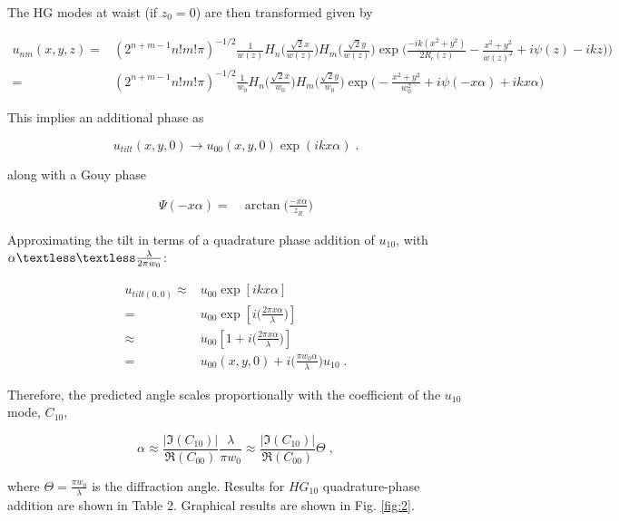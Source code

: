 \documentclass[aps,twoside,secnumarabic,balancelastpage,amsmath,amssymb,nofootinbib,hyperref=pdftex]{revtex4}
\newcommand{\bigfrac}[2]{\Big( \frac{#1}{#2}\Big)}
\begin{document}
The HG modes at waist (if $z_0 = 0$) are then transformed given by

	\begin{align*} 
		u_{nm}(x,y,z)=&(2^{n+m-1}n!m!\pi)^{-1/2}
		\frac{1}{w(z)}H_{n} \Big( \frac{\sqrt{2}x}{w(z)} \Big)
		H_{m} \Big(\frac{\sqrt{2}y}{w(z)} \Big)
		\exp 
		\Big(
		\frac{-ik(x^{2}+y^{2})}{2R_{c}(z)}
		-\frac{x^{2}+y^{2}}{w(z)^{2}} 
		+i \psi(z) - ikz )	
		\Big)
		\\=&
		(2^{n+m-1}n!m!\pi)^{-1/2}
		\frac{1}{w_0}H_{n} \Big( \frac{\sqrt{2}x}{w_0} \Big)
		H_{m} \Big(\frac{\sqrt{2}y}{w_0} \Big)
		\exp 
		\Big(
		-\frac{x^{2}+y^{2}}{w_0^{2}} 
		+i \psi(-x\alpha) + ikx\alpha
		\Big)
	\end{align*}

This implies an additional phase as
	
	\begin{equation} \label{eq:11}
		u_{tilt}(x,y,0) \rightarrow 
		u_{00}(x,y,0) \exp(ikx\alpha)\;.
	\end{equation}

along with a Gouy phase

\begin{align*}
\Psi(-x\alpha)
 =& \arctan\Big( \frac{ -x\alpha}{z_R} \Big)
\end{align*}


Approximating the tilt in terms of a quadrature phase addition of $u_{10}$, with $\alpha \textless\textless \frac{\lambda}{2\pi w_{0}}$:
	
	
	\begin{align}\label{eq:12}
		u_{tilt (0,0)} 
			\approx & u_{00} \exp \left[ ikx\alpha \right]
		\nonumber\\
			= & u_{00} \exp \left[ i \bigfrac{2 \pi x \alpha}{\lambda} \right]
		\nonumber\\ 
			\approx & u_{00} \left[
			1 + i \bigfrac{2 \pi x \alpha}{\lambda} \right]
			\nonumber\\
			= & u_{00}(x,y,0) + i  \bigfrac{\pi w_{0} \alpha}{\lambda}u_{10} \; .
	\end{align}
	
Therefore, the predicted angle scales proportionally with the coefficient of the $u_{10}$ mode, $C_{10}$,

	\begin{equation}
    	\alpha \approx \frac{|\Im(C_{10})|}{\Re(C_{00})}\frac{ \lambda}{\pi w_{0} } \approx \frac{|\Im(C_{10})|}{\Re(C_{00})}\Theta \; ,
	\end{equation}
	
where $\Theta = \frac{\pi w_{0}}{\lambda}$ is the diffraction angle. Results for $HG_{10}$ quadrature-phase addition are shown in Table 2. Graphical results are shown in Fig. \ref{fig:2}.
\end{document}
